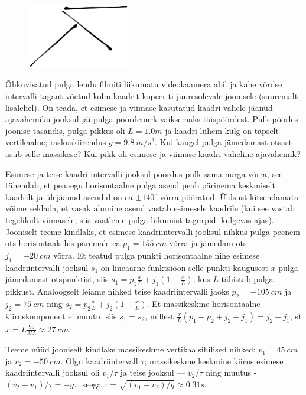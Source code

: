 
\begin{figure}
	\vspace{-25pt}
	\begin{center}
		\includegraphics[width = 0.4\textwidth]{2018-lahg-10-yl.pdf}
	\end{center}
\end{figure}

Õhkuvisatud pulga lendu filmiti liikumatu videokaamera abil ja kahe võrdse intervalli tagant võetud kolm kaadrit kopeeriti juuresolevale joonisele (suuremalt lisalehel). On teada, et esimese ja viimase kasutatud kaadri vahele jäänud ajavahemiku jooksul jäi pulga pöördenurk väiksemaks täispöördest. Pulk pöörles joonise tasandis, pulga pikkus oli $L=\SI{1.0}m$ ja kaadri lühem külg on täpselt vertikaalne; raskuskiirendus $g=\SI{9.8}{m/s^2}$. Kui kaugel pulga jämedamast otsast asub selle massikese? Kui pikk oli esimese ja viimase kaadri vaheline ajavahemik?


\hint

\solu
Esimese ja teise kaadri-intervalli jooksul pöördus pulk sama nurga võrra, see tähendab, et peaaegu horisontaalne pulga asend peab pärinema keskmiselt kaadrilt ja ülejäänud asendid on ca $\pm 140^\circ$ võrra pööratud. Üldsust kitsendamata võime eeldada, et vasak alumine asend vastab esimesele kaadrile (kui see vastab tegelikult viimasele, siis vaatleme pulga liikumist tagurpidi kulgevas ajas). Jooniselt teeme kindlaks, et esimese kaadriintervalli jooksul nihkus pulga peenem ots horisontaalsihis paremale ca $p_1=\SI{155}{cm}$ võrra ja jämedam ots --- $j_1=\SI{-20}{cm}$  võrra. Et teatud pulga punkti horisontaalne nihe esimese kaadriintervalli jooksul $s_1$ on lineaarne funktsioon selle punkti kaugusest $x$ pulga jämedamast otspunktist, siis $s_1=p_1\frac xL+j_1(1-\frac xL)$, kus $L$ tähistab pulga pikkust. Analoogselt leiame nihked teise kaadriintervalli jaoks $p_2=\SI{-105}{cm}$ ja $j_2=\SI{75}{cm}$ ning $s_2=p_2\frac xL+j_2(1-\frac xL)$. Et massikeskme horisontaalne kiiruskomponent ei muutu, siis $s_1=s_2$, millest $\frac xL(p_1-p_2+j_2-j_1)=j_2-j_1$, st $x=L\frac{95}{355}\approx \SI{27}{cm}$.

Teeme nüüd jooniselt kindlaks massikeskme vertikaalsihilised nihked: $v_1=\SI{45}{cm}$ ja $v_2=\SI{-50}{cm}$.
Olgu kaadriintervall $\tau$; massikeskme keskmine kiirus esimese kaadriintervalli jooksul oli $v_1/\tau$ ja teise jooksul --- $v_2/\tau$ ning muutus - $(v_2-v_1)/\tau= -g\tau$, seega $\tau=\sqrt{(v_1-v_2)/g}\approx \SI{0.31}s$.
\probend